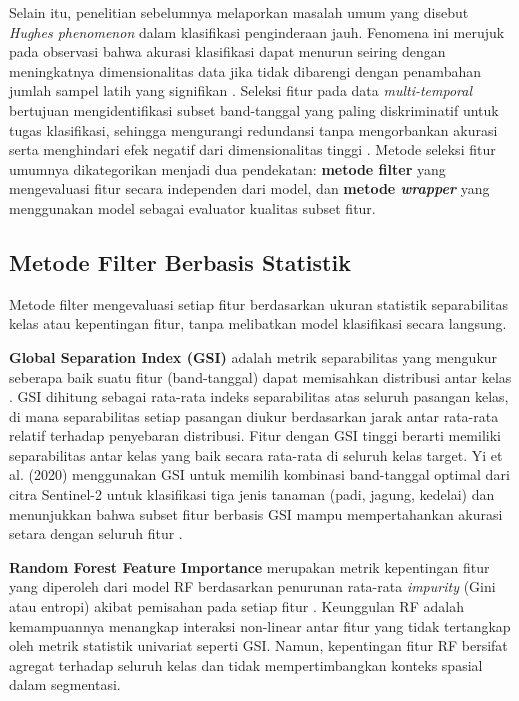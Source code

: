 Selain itu, penelitian sebelumnya melaporkan masalah umum yang disebut \textit{Hughes phenomenon} dalam klasifikasi penginderaan jauh. Fenomena ini merujuk pada observasi bahwa akurasi klasifikasi dapat menurun seiring dengan meningkatnya dimensionalitas data jika tidak dibarengi dengan penambahan jumlah sampel latih yang signifikan \citep{yang2020}.
Seleksi fitur pada data \textit{multi-temporal} bertujuan mengidentifikasi subset band-tanggal yang paling diskriminatif untuk tugas klasifikasi, sehingga mengurangi redundansi tanpa mengorbankan akurasi serta menghindari efek negatif dari dimensionalitas tinggi \citep{rs12010162}.
Metode seleksi fitur umumnya dikategorikan menjadi dua pendekatan: \textbf{metode filter} yang mengevaluasi fitur secara independen dari model, dan \textbf{metode \textit{wrapper}} yang menggunakan model sebagai evaluator kualitas subset fitur.

\subsection{Metode Filter Berbasis Statistik}
Metode filter mengevaluasi setiap fitur berdasarkan ukuran statistik separabilitas kelas atau kepentingan fitur, tanpa melibatkan model klasifikasi secara langsung.

\textbf{Global Separation Index (GSI)} adalah metrik separabilitas yang mengukur seberapa baik suatu fitur (band-tanggal) dapat memisahkan distribusi antar kelas \citep{rs12010162}.
GSI dihitung sebagai rata-rata indeks separabilitas atas seluruh pasangan kelas, di mana separabilitas setiap pasangan diukur berdasarkan jarak antar rata-rata relatif terhadap penyebaran distribusi.
Fitur dengan GSI tinggi berarti memiliki separabilitas antar kelas yang baik secara rata-rata di seluruh kelas target.
Yi et al. (2020) menggunakan GSI untuk memilih kombinasi band-tanggal optimal dari citra Sentinel-2 untuk klasifikasi tiga jenis tanaman (padi, jagung, kedelai) dan menunjukkan bahwa subset fitur berbasis GSI mampu mempertahankan akurasi setara dengan seluruh fitur \citep{rs12010162}.

\textbf{Random Forest Feature Importance} merupakan metrik kepentingan fitur yang diperoleh dari model RF berdasarkan penurunan rata-rata \textit{impurity} (Gini atau entropi) akibat pemisahan pada setiap fitur \citep{yi2020}.
Keunggulan RF adalah kemampuannya menangkap interaksi non-linear antar fitur yang tidak tertangkap oleh metrik statistik univariat seperti GSI.
Namun, kepentingan fitur RF bersifat agregat terhadap seluruh kelas dan tidak mempertimbangkan konteks spasial dalam segmentasi.

